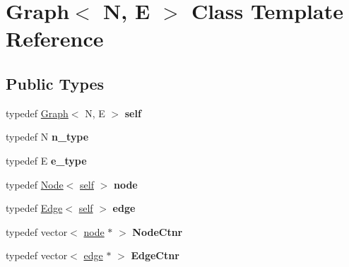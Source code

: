 \hypertarget{classGraph}{\section{\-Graph$<$ \-N, \-E $>$ \-Class \-Template \-Reference}
\label{classGraph}
}
\subsection*{\-Public \-Types}
\begin{DoxyCompactItemize}
\item 
\hypertarget{classGraph_a5047b338bd40f8c916114d0a7d6a6018}{typedef \hyperlink{classGraph}{\-Graph}$<$ \-N, \-E $>$ {\bfseries self}}\label{classGraph_a5047b338bd40f8c916114d0a7d6a6018}

\item 
\hypertarget{classGraph_a44c96be7ad7034437b1afca115f396f3}{typedef \-N {\bfseries n\-\_\-type}}\label{classGraph_a44c96be7ad7034437b1afca115f396f3}

\item 
\hypertarget{classGraph_a64a934f03c018bddaeabd71d2dd6fadb}{typedef \-E {\bfseries e\-\_\-type}}\label{classGraph_a64a934f03c018bddaeabd71d2dd6fadb}

\item 
\hypertarget{classGraph_a8abb89bf2453b0096b21ae920877244a}{typedef \hyperlink{classNode}{\-Node}$<$ \hyperlink{classGraph}{self} $>$ {\bfseries node}}\label{classGraph_a8abb89bf2453b0096b21ae920877244a}

\item 
\hypertarget{classGraph_afe438d36ce43c49c906f3a88c1f22a33}{typedef \hyperlink{classEdge}{\-Edge}$<$ \hyperlink{classGraph}{self} $>$ {\bfseries edge}}\label{classGraph_afe438d36ce43c49c906f3a88c1f22a33}

\item 
\hypertarget{classGraph_a9d87ce4dacaf2a00a7270ea0c2b6a418}{typedef vector$<$ \hyperlink{classNode}{node} $\ast$ $>$ {\bfseries \-Node\-Ctnr}}\label{classGraph_a9d87ce4dacaf2a00a7270ea0c2b6a418}

\item 
\hypertarget{classGraph_a44322b074cbcc1a48a321f7789a08e58}{typedef vector$<$ \hyperlink{classEdge}{edge} $\ast$ $>$ {\bfseries \-Edge\-Ctnr}}\label{classGraph_a44322b074cbcc1a48a321f7789a08e58}

\end{DoxyCompactItemize}
